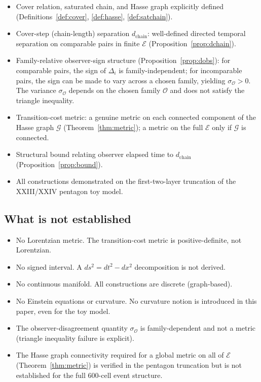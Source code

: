 \documentclass[12pt]{article}
\newcommand{\Ecal}{\mathcal{E}}
\newcommand{\Ocal}{\mathcal{O}}
\newcommand{\Gcal}{\mathcal{G}}
\begin{document}
\begin{itemize}
    \item Cover relation, saturated chain, and Hasse graph explicitly defined (Definitions~\ref{def:cover}, \ref{def:hasse}, \ref{def:satchain}).
    \item Cover-step (chain-length) separation $d_{\mathrm{chain}}$: well-defined directed temporal separation on comparable pairs in finite $\Ecal$ (Proposition~\ref{prop:dchain}).
    \item Family-relative observer-sign structure (Proposition~\ref{prop:dobs}): for comparable pairs, the sign of $\Delta_i$ is family-independent; for incomparable pairs, the sign can be made to vary across a chosen family, yielding $\sigma_{\Ocal} > 0$. The variance $\sigma_{\Ocal}$ depends on the chosen family $\Ocal$ and does not satisfy the triangle inequality.
    \item Transition-cost metric: a genuine metric on each connected component of the Hasse graph $\Gcal$ (Theorem~\ref{thm:metric}); a metric on the full $\Ecal$ only if $\Gcal$ is connected.
    \item Structural bound relating observer elapsed time to $d_{\mathrm{chain}}$ (Proposition~\ref{prop:bound}).
    \item All constructions demonstrated on the first-two-layer truncation of the XXIII/XXIV pentagon toy model.
\end{itemize}

\subsection{What is not established}

\begin{itemize}
    \item No Lorentzian metric. The transition-cost metric is positive-definite, not Lorentzian.
    \item No signed interval. A $ds^2 = dt^2 - dx^2$ decomposition is not derived.
    \item No continuous manifold. All constructions are discrete (graph-based).
    \item No Einstein equations or curvature. No curvature notion is introduced in this paper, even for the toy model.
    \item The observer-disagreement quantity $\sigma_{\Ocal}$ is family-dependent and not a metric (triangle inequality failure is explicit).
    \item The Hasse graph connectivity required for a global metric on all of $\Ecal$ (Theorem~\ref{thm:metric}) is verified in the pentagon truncation but is not established for the full 600-cell event structure.
\end{itemize}
\end{document}
